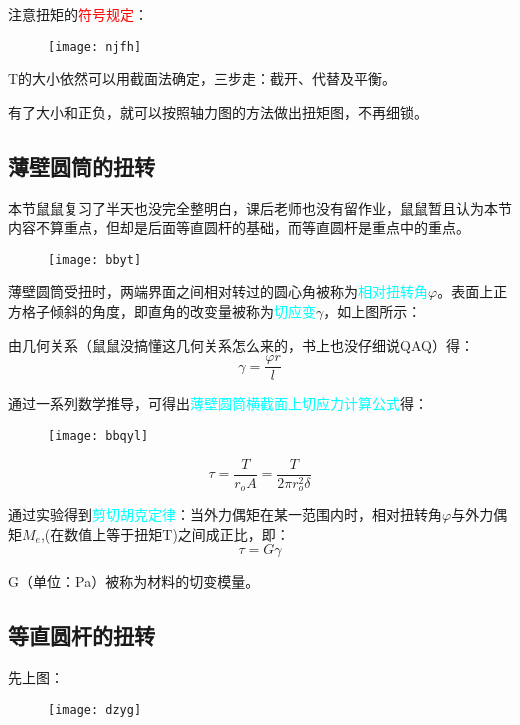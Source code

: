 \documentclass[10pt,a4paper]{ctexart}
\begin{document}
注意扭矩的\textcolor{red}{符号规定}：
\begin{figure}[htp]%
	\centering
	\texttt{[image: njfh]}
\end{figure}

T的大小依然可以用截面法确定，三步走：截开、代替及平衡。

有了大小和正负，就可以按照轴力图的方法做出扭矩图，不再细锁。

\subsection{薄壁圆筒的扭转}
本节鼠鼠复习了半天也没完全整明白，课后老师也没有留作业，鼠鼠暂且认为本节内容不算重点，但却是后面等直圆杆的基础，而等直圆杆是重点中的重点。

\begin{figure}[htp]%
	\centering
	\texttt{[image: bbyt]}
\end{figure}

薄壁圆筒受扭时，两端界面之间相对转过的圆心角被称为\textcolor{cyan}{相对扭转角}$\varphi$。表面上正方格子倾斜的角度，即直角的改变量被称为\textcolor{cyan}{切应变}$\gamma$，如上图所示：

由几何关系（鼠鼠没搞懂这几何关系怎么来的，书上也没仔细说QAQ）得：
\begin{equation}
	\gamma=\frac{\varphi r}{l}
\end{equation}

通过一系列数学推导，可得出\textcolor{cyan}{薄壁圆筒横截面上切应力计算公式}得：
\begin{figure}[htp]%
	\centering
	\texttt{[image: bbqyl]}
\end{figure}
\begin{equation}
	\tau=\frac{T}{r_oA}=\frac{T}{2\pi r_o^2\delta}
\end{equation}

通过实验得到\textcolor{cyan}{剪切胡克定律}：当外力偶矩在某一范围内时，相对扭转角$\varphi$与外力偶矩$M_e$,(在数值上等于扭矩T)之间成正比，即：
\begin{equation}
	\tau=G\gamma
	\label{jq}
\end{equation}

G（单位：Pa）被称为材料的切变模量。

\subsection{等直圆杆的扭转}
先上图：
\begin{figure}[htp]%
	\centering
	\texttt{[image: dzyg]}
\end{figure}
\end{document}
